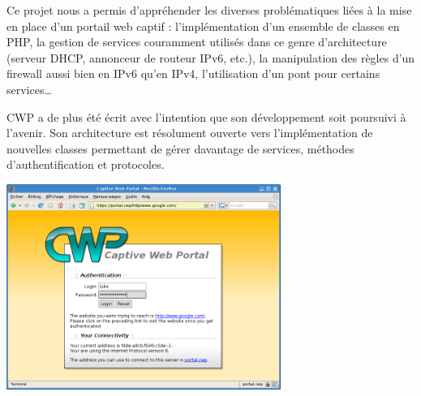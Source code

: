 \documentclass[a4paper,11pt]{report}
\newcommand{\cwp}{%
  CWP%
}
\begin{document}
Ce projet nous a permis d'appréhender les diverses problématiques liées à la
mise en place d'un portail web captif : l'implémentation d'un ensemble de
classes en PHP, la gestion de services couramment utilisés dans ce genre
d'architecture (serveur DHCP, annonceur de routeur IPv6, etc.), la
manipulation des règles d'un firewall aussi bien en IPv6 qu'en IPv4,
l'utilisation d'un pont pour certains services\dots

\cwp{} a de plus été écrit avec l'intention que son développement soit
poursuivi à l'avenir. Son architecture est résolument ouverte vers
l'implémentation de nouvelles classes permettant de gérer davantage de
services, méthodes d'authentification et protocoles.

\begin{center}
  \bigskip\noindent
  \includegraphics[keepaspectratio,width=0.67\textwidth]{images/screenshot}
\end{center}
\end{document}
